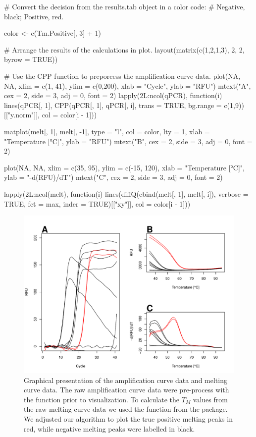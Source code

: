 \begin{example}
# Convert the decision from the results.tab object in a color code:
# Negative, black; Positive, red.

color <- c(Tm.Positive[, 3] + 1)

# Arrange the results of the calculations in plot.
layout(matrix(c(1,2,1,3), 2, 2, byrow = TRUE))

# Use the CPP function to preporcess the amplification curve data.
plot(NA, NA, xlim = c(1, 41), ylim = c(0,200), xlab = "Cycle", ylab = "RFU")
mtext("A", cex = 2, side = 3, adj = 0, font = 2)
lapply(2L:ncol(qPCR), function(i) 
  lines(qPCR[, 1], 
        CPP(qPCR[, 1], qPCR[, i], trans = TRUE, 
            bg.range = c(1,9))[["y.norm"]],
        col = color[i - 1]))

matplot(melt[, 1], melt[, -1], type = "l", col = color, 
        lty = 1, xlab = "Temperature [°C]", ylab = "RFU")
mtext("B", cex = 2, side = 3, adj = 0, font = 2)

plot(NA, NA, xlim = c(35, 95), ylim = c(-15, 120), xlab = "Temperature [°C]", 
     ylab = "-d(RFU)/dT")
mtext("C", cex = 2, side = 3, adj = 0, font = 2)

lapply(2L:ncol(melt), function(i)
  lines(diffQ(cbind(melt[, 1], melt[, i]), verbose = TRUE, 
              fct = max, inder = TRUE)[["xy"]], col = color[i - 1]))
\end{example}

\begin{figure}[htbp]
  \centering
  \includegraphics[clip=true, width=16cm]{figures/amp_melt.pdf}
  \caption{Graphical presentation of the amplification curve data and melting 
curve data.  The raw amplification curve data were pre-process with 
the  function prior to visualization. To calculate the $T_{M}$ values 
from the raw melting curve data  we used the  function 
from the  package.  We adjusted our algorithm to 
plot the true positive melting peaks in red, while negative melting peaks were 
labelled in black.} 
\label{figure:amp_melt}
\end{figure}

